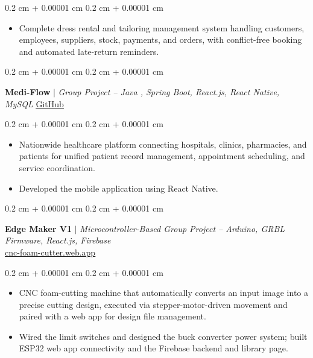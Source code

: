 \documentclass[10pt, letterpaper]{article}
\newenvironment{highlights}{
	\vspace{0.05 cm}
	\begin{itemize}[
		topsep=0.10 cm,
		parsep=0.10 cm,
		partopsep=0pt,
		itemsep=0pt,
		leftmargin=0.4 cm + 10pt
	]
	}{
	\end{itemize}
} %
\newenvironment{onecolentry}{
	\begin{adjustwidth}{
		0.2 cm + 0.00001 cm
	}{
		0.2 cm + 0.00001 cm
	}
	}{
	\end{adjustwidth}
} %
\let\hrefWithoutArrow\href
\renewcommand{\href}[2]{\hrefWithoutArrow{#1}{\ifthenelse{\equal{#2}{}}{ }{#2 }}}
\begin{document}
	\vspace{0.09 cm}
	\begin{onecolentry}
		\begin{highlights}
			\item Complete dress rental and tailoring management system handling customers, employees, suppliers, stock, payments, and orders, with conflict-free booking and automated late-return reminders.
		\end{highlights}
	\end{onecolentry}
	\vspace{0.24 cm}
	\begin{onecolentry}
		\textbf{Medi-Flow} $|$ \textit{Group Project -- Java , Spring Boot, React.js, React Native, MySQL} \hfill \hrefWithoutArrow{https://github.com/INNOV8SOFT-PVT-LTD/MediFlowApp.git}{\underline{GitHub}}
	\end{onecolentry}
	\vspace{0.09 cm}
	\begin{onecolentry}
		\begin{highlights}
			\item Nationwide healthcare platform connecting hospitals, clinics, pharmacies, and patients for unified patient record management, appointment scheduling, and service coordination.
			\item Developed the mobile application using React Native.
		\end{highlights}
	\end{onecolentry}
	\vspace{0.24 cm}
	\begin{onecolentry}
		\textbf{Edge Maker V1} $|$ \textit{ Microcontroller-Based Group Project -- Arduino, GRBL Firmware, React.js, Firebase} \\
		\hrefWithoutArrow{https://cnc-foam-cutter.web.app/}{\underline{cnc-foam-cutter.web.app}}
	\end{onecolentry}
	\vspace{0.09 cm}
	\begin{onecolentry}
		\begin{highlights}
			\item CNC foam-cutting machine that automatically converts an input image into a precise cutting design, executed via stepper-motor-driven movement and paired with a web app for design file management.
			\item Wired the limit switches and designed the buck converter power system; built ESP32 web app connectivity and the Firebase backend and library page.
		\end{highlights}
	\end{onecolentry}
\end{document}
